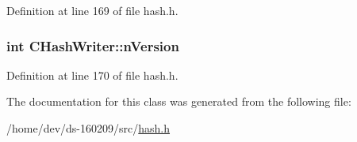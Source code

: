 Definition at line 169 of file hash.\+h.

\hypertarget{class_c_hash_writer_ad7d3642addab58385476dc0f9d55fa58}{}
\subsubsection[{n\+Version}]{\setlength{\rightskip}{0pt plus 5cm}int C\+Hash\+Writer\+::n\+Version}\label{class_c_hash_writer_ad7d3642addab58385476dc0f9d55fa58}


Definition at line 170 of file hash.\+h.



The documentation for this class was generated from the following file\+:\begin{DoxyCompactItemize}
\item 
/home/dev/ds-\/160209/src/\hyperlink{hash_8h}{hash.\+h}\end{DoxyCompactItemize}
